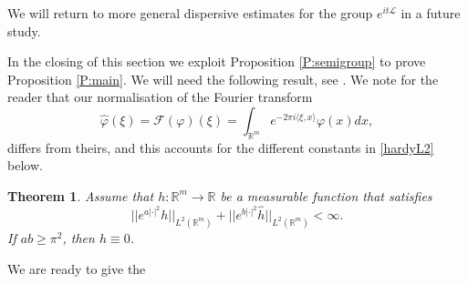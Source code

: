 \documentclass[11pt,a4paper]{amsart}
\def \R {\mathbb{R}}
\def \vf{\varphi}
\newcommand{\Rm}{\mathbb R^m}
\numberwithin{equation}{section}
\newcommand{\sa}{\langle}
\newcommand{\da}{\rangle}
\newtheorem{theorem}{Theorem}[section]
\numberwithin{equation}{section}
\begin{document}
We will  return to more general dispersive estimates for the group $e^{it\mathscr L}$ in a future study. 
 


In the closing of this section we exploit Proposition \ref{P:semigroup} to prove Proposition \ref{P:main}.
We will need the following result, see \cite[Theorem 1.1]{CEKPV}. We note for the reader that our normalisation of the Fourier transform
\begin{equation}\label{ft}
\hat \vf(\xi) = \mathscr F(\vf)(\xi) = \int_{\Rm} e^{-2\pi i\sa \xi,x\da} \vf(x) dx,
\end{equation}
differs from theirs, and this accounts for the different constants in \eqref{hardyL2} below. 


\begin{theorem}\label{T:har2}
Assume that $h:\Rm\to \R$ be a measurable function that satisfies 
\begin{equation}\label{hardyL2}
||e^{a|\cdot|^2} h||_{L^2(\Rm)} + ||e^{b|\cdot|^2} \hat h||_{L^2(\Rm)}<\infty.
\end{equation}
If $a b\ge \pi^2$, then $h\equiv 0$.  
\end{theorem} 

We are ready to give the 
\end{document}
